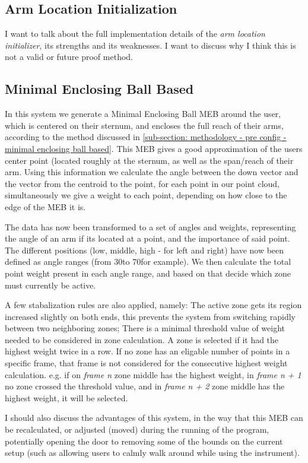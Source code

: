 \subsection{Arm Location Initialization}
\label{sub-section: methodology - different approaches - arm location initialization}
I want to talk about the full implementation details of the \textit{arm location initializer}, its strengths and its weaknesses.
I want to discuss why I think this is not a valid or future proof method.


\subsection{Minimal Enclosing Ball Based}
\label{sub-section: methodology - different approaches - minimal enclosing ball based}
In this system we generate a Minimal Enclosing Ball {MEB} around the user, which is centered on their sternum, and encloses the full reach of their arms, according to the method discussed in \cref{sub-section: methodology - pre config - minimal enclosing ball based}.
This MEB gives a good approximation of the users center point (located roughly at the sternum, as well as the span/reach of their arm.
Using this information we calculate the angle between the down vector and the vector from the centroid to the point, for each point in our point cloud, simultaneously we give a weight to each point, depending on how close to the edge of the MEB it is.

The data has now been transformed to a set of angles and weights, representing the angle of an arm if its located at a point, and the importance of said point.
The different positions (low, middle, high - for left and right) have now been defined as angle ranges (from 30\deg to 70\deg for example).
We then calculate the total point weight present in each angle range, and based on that decide which zone must currently be active.

A few stabalization rules are also applied, namely: 
The active zone gets its region increased slightly on both ends, this prevents the system from switching rapidly between two neighboring zones;
There is a minimal threshold value of weight needed to be considered in zone calculation.
A zone is selected if it had the highest weight twice in a row.
If no zone has an eligable number of points in a specific frame, that frame is not considered for the consecutive highest weight calculation.
e.g. if on \textit{frame n} zone middle has the highest weight, in \textit{frame n + 1} no zone crossed the threshold value, and in \textit{frame n + 2} zone middle has the highest weight, it will be selected.

I should also discuss the advantages of this system, in the way that this MEB can be recalculated, or adjusted (moved) during the running of the program, potentially opening the door to removing some of the bounds on the current setup (such as allowing users to calmly walk around while using the instrument).
